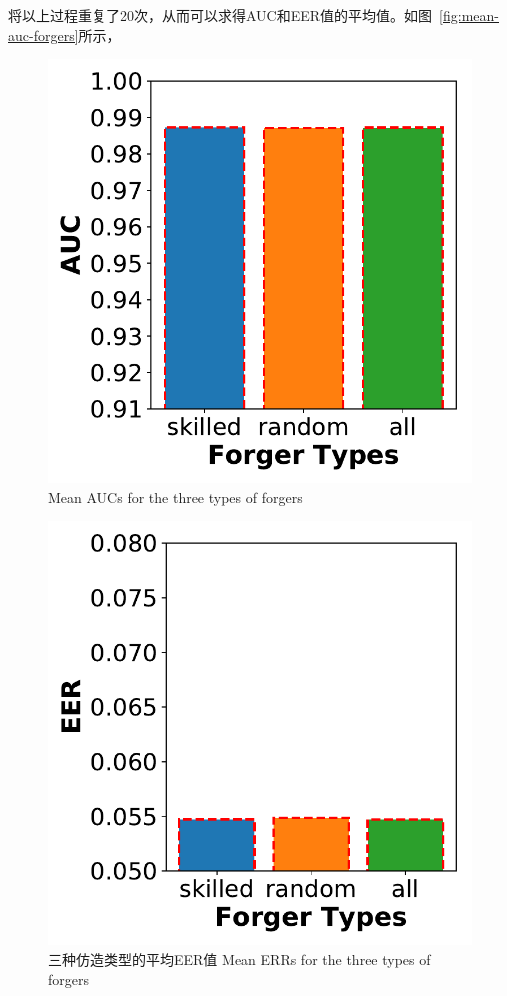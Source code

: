 将以上过程重复了20次，从而可以求得AUC和EER值的平均值。如图~\ref{fig:mean-auc-forgers}所示，
\begin{figure}
  \centering
  \begin{minipage}[t]{0.49\textwidth}
    \centering
    \includegraphics[width=\textwidth]{figure/auc-bars.pdf}
      {Mean AUCs for the three types of forgers}
        \label{fig:mean-auc-forgers}
  \end{minipage}
  \centering
  \begin{minipage}[t]{0.49\textwidth}
    \centering
    \includegraphics[width=\textwidth]{figure/eer-bars.pdf}
    \bicaption
    {三种仿造类型的平均EER值}
    {Mean ERRs for the three types of forgers}
    \label{fig:mean-eer-forgers}
   \end{minipage}
\end{figure}
